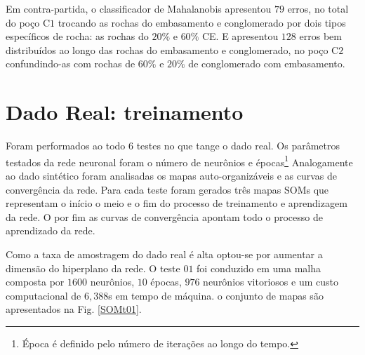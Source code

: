 Em contra-partida, o classificador de Mahalanobis apresentou $79$ erros, no total do poço C$1$ trocando as rochas do embasamento e conglomerado por dois tipos específicos de rocha: as rochas do $20\%$ e $60\%$ CE. E apresentou $128$ erros bem distribuídos ao longo das rochas do embasamento e conglomerado, no poço C$2$ confundindo-as com rochas de $60\%$ e $20\%$ de conglomerado com embasamento. 


\section{Dado Real: treinamento}

Foram performados ao todo $6$ testes no que tange o dado real. Os parâmetros testados da rede neuronal foram o número de neurônios e épocas\footnote{Época é definido pelo número de iterações ao longo do tempo.} Analogamente ao dado sintético foram analisadas os mapas auto-organizáveis e as curvas de convergência da rede. Para cada teste foram gerados três mapas SOMs que representam o início o meio e o fim do processo de treinamento e aprendizagem da rede. O por fim as curvas de convergência apontam todo o processo de aprendizado da rede. 

Como a taxa de amostragem do dado real é alta optou-se por aumentar a dimensão do hiperplano da rede. O teste $01$ foi conduzido em uma malha composta por $1600$ neurônios, $10$ épocas, $976$ neurônios vitoriosos e um custo computacional de $6,388$s em tempo de máquina. o conjunto de mapas são apresentados na Fig. \ref{SOMt01}.

